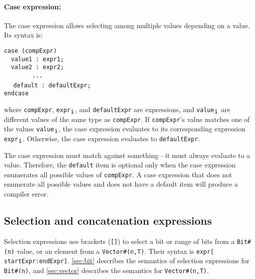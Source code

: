 \paragraph{Case expression:} The case expression allows selecting among multiple values depending on a value. Its syntax is:
\begin{center}
\verb|case (compExpr)           | \\
\verb|  value1 : expr1;         | \\
\verb|  value2 : expr2;         | \\
\verb|        ...               | \\
\verb|  | \tmp{$[$} \verb|default : defaultExpr;  |\tmp{$]$} \\
\verb|endcase                   |
\end{center}
where \verb|compExpr|, \verb|expr|$_{\verb|i|}$, and \verb|defaultExpr| are expressions,
and \verb|value|$_{\verb|i|}$ are different values of the same type as \verb|compExpr|.
If \verb|compExpr|'s value matches one of the values \verb|value|$_{\verb|i|}$,
the case expression evaluates to its corresponding expression \verb|expr|$_{\verb|i|}$.
Otherwise, the case expression evaluates to \verb|defaultExpr|.

The case expression must match against something---it must always evaluate to a value.
Therefore, the \verb|default| item is optional only when the case expression enumerates
all possible values of \verb|compExpr|.
A case expression that does not enumerate all possible values and does not have a default
item will produce a compiler error.

%
%

\subsection{Selection and concatenation expressions}

Selection expressions use brackets (\verb|[]|) to select a bit or range of bits from a \verb|Bit#(n)| value,
or an element from a \verb|Vector#(n,T)|.
Their syntax is \verb|expr[ startExpr|\tmp{$[$}\verb|:endExpr|\tmp{$]$}\verb|]|.
\autoref{sec:bit} describes the semantics of selection expressions for \verb|Bit#(n)|,
and \autoref{sec:vector} describes the semantics for \verb|Vector#(n,T)|.

